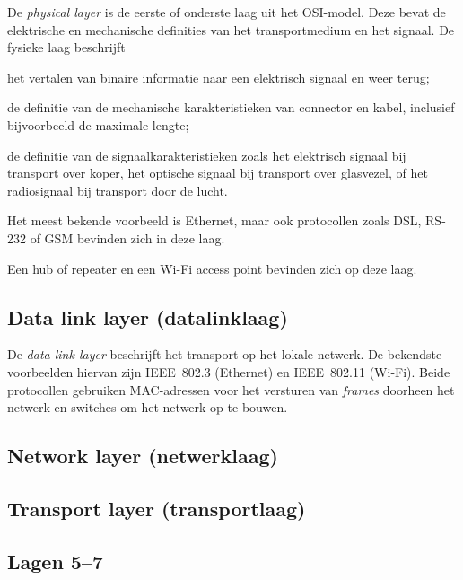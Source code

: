 De \emph{physical layer} is de eerste of onderste laag uit het OSI-model.
Deze bevat de elektrische en mechanische definities van het transportmedium en het signaal.
De fysieke laag beschrijft
\begin{inlinelist}
\item het vertalen van binaire informatie naar een elektrisch signaal en weer terug;
\item de definitie van de mechanische karakteristieken van connector en kabel, inclusief bijvoorbeeld de maximale lengte;
\item de definitie van de signaalkarakteristieken zoals het elektrisch signaal bij transport over koper, het optische signaal bij transport over glasvezel, of het radiosignaal bij transport door de lucht.
\end{inlinelist}
Het meest bekende voorbeeld is Ethernet, maar ook protocollen zoals DSL, RS-232 of GSM bevinden zich in deze laag.

Een hub of repeater en een Wi-Fi access point bevinden zich op deze laag.

\subsection{Data link layer (datalinklaag)}

De \emph{data link layer} beschrijft het transport op het lokale netwerk.
De bekendste voorbeelden hiervan zijn IEEE~802.3 (Ethernet) en IEEE~802.11 (Wi-Fi).
Beide protocollen gebruiken MAC-adressen voor het versturen van \emph{frames} doorheen het netwerk en switches om het netwerk op te bouwen.


\subsection{Network layer (netwerklaag)}
\subsection{Transport layer (transportlaag)}
\subsection{Lagen 5--7}
